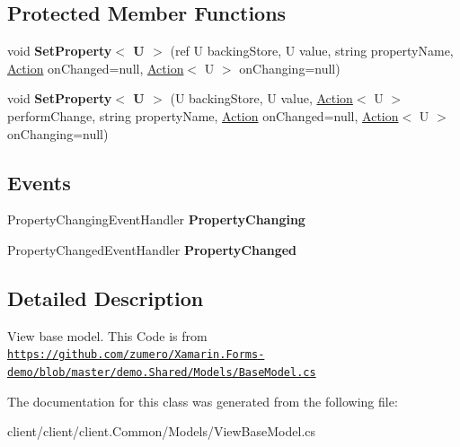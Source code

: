 \subsection*{Protected Member Functions}
\begin{DoxyCompactItemize}
\item 
\hypertarget{classClient_1_1Common_1_1Models_1_1ViewBaseModel_a3bc77c2290403df5a831d489e8e21b85}{}void {\bfseries Set\+Property$<$ U $>$} (ref U backing\+Store, U value, string property\+Name, \hyperlink{classCore_1_1Models_1_1Action}{Action} on\+Changed=null, \hyperlink{classCore_1_1Models_1_1Action}{Action}$<$ U $>$ on\+Changing=null)\label{classClient_1_1Common_1_1Models_1_1ViewBaseModel_a3bc77c2290403df5a831d489e8e21b85}

\item 
\hypertarget{classClient_1_1Common_1_1Models_1_1ViewBaseModel_a433581bc6700c98268c6d5369ec3fbd4}{}void {\bfseries Set\+Property$<$ U $>$} (U backing\+Store, U value, \hyperlink{classCore_1_1Models_1_1Action}{Action}$<$ U $>$ perform\+Change, string property\+Name, \hyperlink{classCore_1_1Models_1_1Action}{Action} on\+Changed=null, \hyperlink{classCore_1_1Models_1_1Action}{Action}$<$ U $>$ on\+Changing=null)\label{classClient_1_1Common_1_1Models_1_1ViewBaseModel_a433581bc6700c98268c6d5369ec3fbd4}

\end{DoxyCompactItemize}
\subsection*{Events}
\begin{DoxyCompactItemize}
\item 
\hypertarget{classClient_1_1Common_1_1Models_1_1ViewBaseModel_a891cf84357c775a6924876525bcd0421}{}Property\+Changing\+Event\+Handler {\bfseries Property\+Changing}\label{classClient_1_1Common_1_1Models_1_1ViewBaseModel_a891cf84357c775a6924876525bcd0421}

\item 
\hypertarget{classClient_1_1Common_1_1Models_1_1ViewBaseModel_a131179a8fb913c864263e8ce41ac2f6a}{}Property\+Changed\+Event\+Handler {\bfseries Property\+Changed}\label{classClient_1_1Common_1_1Models_1_1ViewBaseModel_a131179a8fb913c864263e8ce41ac2f6a}

\end{DoxyCompactItemize}


\subsection{Detailed Description}
View base model. This Code is from \href{https://github.com/zumero/Xamarin.Forms-demo/blob/master/demo.Shared/Models/BaseModel.cs}{\tt https\+://github.\+com/zumero/\+Xamarin.\+Forms-\/demo/blob/master/demo.\+Shared/\+Models/\+Base\+Model.\+cs} 



The documentation for this class was generated from the following file\+:\begin{DoxyCompactItemize}
\item 
client/client/client.\+Common/\+Models/View\+Base\+Model.\+cs\end{DoxyCompactItemize}
